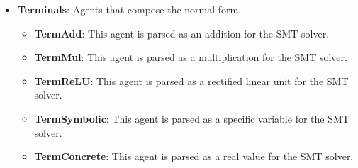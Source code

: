 \begin{itemize}
\begin{itemize}
			\item \textbf{Materialize}: Converts a Linear agent into an explicit representation for the SMT solver.
		\end{itemize}
	\item
		\textbf{Terminals}: Agents that compose the normal form.
		\begin{itemize}
			\item \textbf{TermAdd}: This agent is parsed as an addition for the SMT solver.
			\item \textbf{TermMul}: This agent is parsed as a multiplication for the SMT solver.
			\item \textbf{TermReLU}: This agent is parsed as a rectified linear unit for the SMT solver.
			\item \textbf{TermSymbolic}: This agent is parsed as a specific variable for the SMT solver.
			\item \textbf{TermConcrete}: This agent is parsed as a real value for the SMT solver.
		\end{itemize}
\end{itemize}

